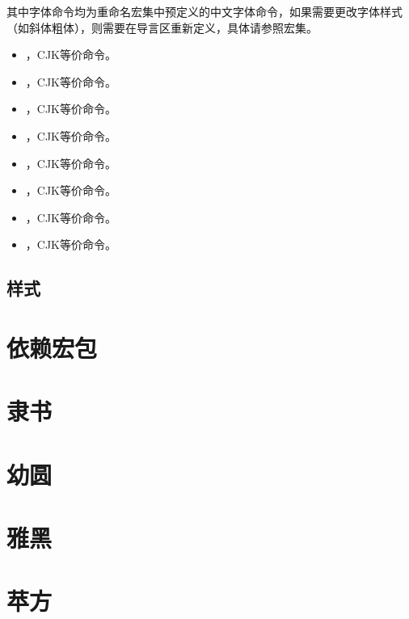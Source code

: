 \documentclass[AutoFakeBold,AutoFakeSlant]{ctexart}
\begin{document}
其中字体命令均为重命名\CTeX 宏集中预定义的中文字体命令，如果需要更改字体样式（如斜体粗体），则需要在导言区重新定义，具体请参照\CTeX 宏集。

\begin{itemize}
	\item {}，CJK等价命令。
	\item {}，CJK等价命令。
	\item {}，CJK等价命令。
	\item {}，CJK等价命令。
	\item {}，CJK等价命令。
	\item {}，CJK等价命令。
	\item {}，CJK等价命令。
	\item {}，CJK等价命令。
\end{itemize}



\subsection{样式}





\section{依赖宏包}











\section{隶书}

\section{幼圆}

\section{雅黑}
    \zhlipsum[7]

\section{苹方}
\end{document}
